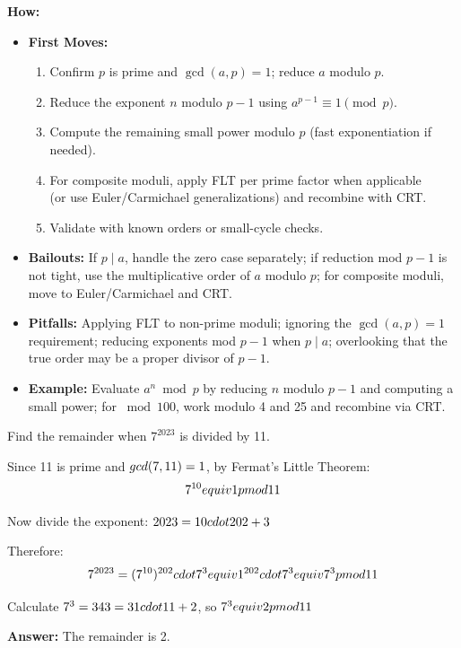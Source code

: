 \documentclass[12pt]{article}
\newenvironment{problem}[1]
{\begin{tcolorbox}[colback=blue!5!white,colframe=blue!75!black,title={#1}]}{\end{tcolorbox}}
\newenvironment{solution}
{\begin{tcolorbox}[colback=green!5!white,colframe=green!75!black,title={Solution}]}{\end{tcolorbox}}
\begin{document}
\textbf{How:}
\begin{itemize}
    \item \textbf{First Moves:}
    \begin{enumerate}[nosep]
        \item Confirm $p$ is prime and $\gcd(a,p)=1$; reduce $a$ modulo $p$.
        \item Reduce the exponent $n$ modulo $p-1$ using $a^{p-1}\equiv 1\pmod p$.
        \item Compute the remaining small power modulo $p$ (fast exponentiation if needed).
        \item For composite moduli, apply FLT per prime factor when applicable \\
         (or use Euler/Carmichael generalizations) and recombine with CRT.
        \item Validate with known orders or small-cycle checks.
    \end{enumerate}
    \item \textbf{Bailouts:} If $p\mid a$, handle the zero case separately; if reduction mod $p-1$ is not tight, use the multiplicative order of $a$ modulo $p$; for composite moduli, move to Euler/Carmichael and CRT.
    \item \textbf{Pitfalls:} Applying FLT to non-prime moduli; ignoring the $\gcd(a,p)=1$ requirement; reducing exponents mod $p-1$ when $p\mid a$; overlooking that the true order may be a proper divisor of $p-1$.
    \item \textbf{Example:} Evaluate $a^n\bmod p$ by reducing $n$ modulo $p-1$ and computing a small power; for $\bmod 100$, work modulo 4 and 25 and recombine via CRT.
\end{itemize}

\begin{problem}{Example: Large Exponent Modulo Prime}
Find the remainder when $7^{2023}$ is divided by 11.
\end{problem}

\begin{solution}
Since 11 is prime and $\\gcd(7, 11) = 1$, by Fermat's Little Theorem:
$$7^{10} \\equiv 1 \\pmod{11}$$

Now divide the exponent: $2023 = 10 \\cdot 202 + 3$

Therefore:
$$7^{2023} = (7^{10})^{202} \\cdot 7^3 \\equiv 1^{202} \\cdot 7^3 \\equiv 7^3 \\pmod{11}$$

Calculate $7^3 = 343 = 31 \\cdot 11 + 2$, so $7^3 \\equiv 2 \\pmod{11}$

\textbf{Answer:} The remainder is 2.
\end{solution}
\end{document}
